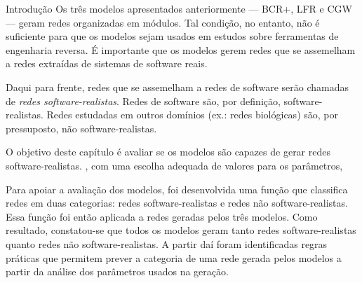 \begin{section}{Introdução}
Os três modelos apresentados anteriormente --- BCR+, LFR e CGW --- geram redes organizadas em módulos. Tal condição, no entanto, não é suficiente para que os modelos sejam usados em estudos sobre ferramentas de engenharia reversa. É importante que os modelos gerem redes que se assemelham a redes extraídas de sistemas de software reais.

Daqui para frente, redes que se assemelham a redes de software serão chamadas de \emph{redes software-realistas}. Redes de software são, por definição, software-realistas. Redes estudadas em outros domínios (ex.: redes biológicas) são, por pressuposto, não software-realistas.

O objetivo deste capítulo é avaliar se os modelos são capazes de gerar redes software-realistas. , com uma escolha adequada de valores para os parâmetros,

Para apoiar a avaliação dos modelos, foi desenvolvida uma função que classifica redes em duas categorias: redes software-realistas e redes não software-realistas. Essa função foi então aplicada a redes geradas pelos três modelos. Como resultado, constatou-se que todos os modelos geram tanto redes software-realistas quanto redes não software-realistas. A partir daí foram identificadas regras práticas que permitem prever a categoria de uma rede gerada pelos modelos a partir da análise dos parâmetros usados na geração.

% 
% 
% 
% 
% 

\end{section}

